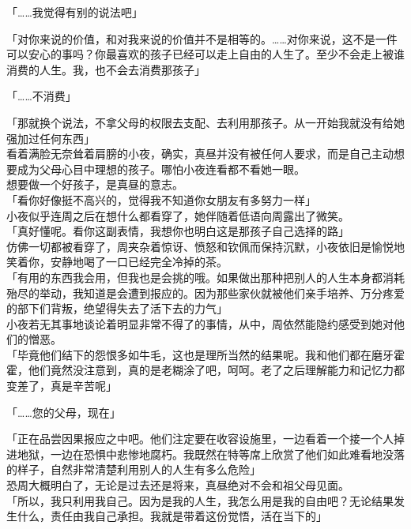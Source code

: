 「……我觉得有别的说法吧」

「对你来说的价值，和对我来说的价值并不是相等的。……对你来说，这不是一件可以安心的事吗？你最喜欢的孩子已经可以走上自由的人生了。至少不会走上被谁消费的人生。我，也不会去消费那孩子」

「……不消费」

「那就换个说法，不拿父母的权限去支配、去利用那孩子。从一开始我就没有给她强加过任何东西」\\

看着满脸无奈耸着肩膀的小夜，确实，真昼并没有被任何人要求，而是自己主动想要成为父母心目中理想的孩子。哪怕小夜连看都不看她一眼。\\

想要做一个好孩子，是真昼的意志。\\

「看你好像挺不高兴的，觉得我不知道你女朋友有多努力一样」\\

小夜似乎连周之后在想什么都看穿了，她伴随着低语向周露出了微笑。\\

「真好懂呢。看你这副表情，我想你也明白这是那孩子自己选择的路」\\

仿佛一切都被看穿了，周夹杂着惊讶、愤怒和钦佩而保持沉默，小夜依旧是愉悦地笑着你，安静地喝了一口已经完全冷掉的茶。\\

「有用的东西我会用，但我也是会挑的哦。如果做出那种把别人的人生本身都消耗殆尽的举动，我知道是会遭到报应的。因为那些家伙就被他们亲手培养、万分疼爱的部下们背叛，绝望得失去了活下去的力气」\\

小夜若无其事地谈论着明显非常不得了的事情，从中，周依然能隐约感受到她对他们的憎恶。\\

「毕竟他们结下的怨恨多如牛毛，这也是理所当然的结果呢。我和他们都在磨牙霍霍，他们竟然没注意到，真的是老糊涂了吧，呵呵。老了之后理解能力和记忆力都变差了，真是辛苦呢」

「……您的父母，现在」

「正在品尝因果报应之中吧。他们注定要在收容设施里，一边看着一个接一个人掉进地狱，一边在恐惧中悲惨地腐朽。我既然在特等席上欣赏了他们如此难看地没落的样子，自然非常清楚利用别人的人生有多么危险」\\

恐周大概明白了，无论是过去还是将来，真昼绝对不会和祖父母见面。\\

「所以，我只利用我自己。因为是我的人生，我怎么用是我的自由吧？无论结果发生什么，责任由我自己承担。我就是带着这份觉悟，活在当下的」

